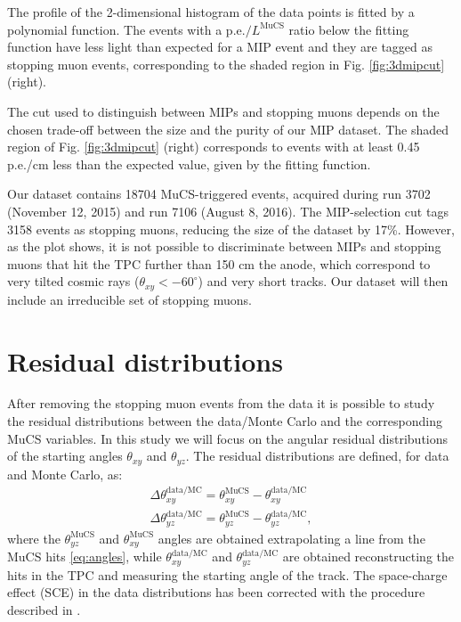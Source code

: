 \documentclass[a4paper]{scrartcl}
\begin{document}
The profile of the 2-dimensional histogram of the data points is fitted by a polynomial function.
The events with a p.e.$/L^{\mathrm{MuCS}}$ ratio below the fitting function have less light than expected for a MIP event and they are tagged as stopping muon events, corresponding to the shaded region in Fig. \ref{fig:3dmipcut} (right). %

The cut used to distinguish between MIPs and stopping muons depends on the chosen trade-off between the size and the purity of our MIP dataset. The shaded region of Fig. \ref{fig:3dmipcut} (right) corresponds to events with at least 0.45 p.e./cm less than the expected value, given by the fitting function.



Our dataset contains 18704 MuCS-triggered events, acquired during run 3702 (November 12, 2015) and run 7106 (August 8, 2016). The MIP-selection cut tags 3158 events as stopping muons, reducing the size of the dataset by 17\%.
However, as the plot shows, it is not possible to discriminate between MIPs and stopping muons that hit the TPC further than 150 cm the anode, which correspond to very tilted cosmic rays ($\theta_{xy}<-60^{\circ}$) and very short tracks. Our dataset will then include an irreducible set of stopping muons.

\section{Residual distributions}
After removing the stopping muon events from the data it is possible to study the residual distributions between the data/Monte Carlo and the corresponding MuCS variables. In this study we will focus on the angular residual distributions of the starting angles $\theta_{xy}$ and $\theta_{yz}$. The residual distributions are defined, for data and Monte Carlo, as:
\begin{align*}
\Delta \theta_{xy}^{\mathrm{data/MC}} = \theta_{xy}^{\mathrm{MuCS}} - \theta_{xy}^{\mathrm{data/MC}}\\
\Delta \theta_{yz}^{\mathrm{data/MC}} = \theta_{yz}^{\mathrm{MuCS}} -  \theta_{yz}^{\mathrm{data/MC}},
\end{align*}
where the $\theta_{yz}^{\mathrm{MuCS}}$ and $\theta_{xy}^{\mathrm{MuCS}}$ angles are obtained extrapolating a line from the MuCS hits \eqref{eq:angles}, while $\theta_{xy}^{\mathrm{data/MC}}$ and $\theta_{yz}^{\mathrm{data/MC}}$ are obtained reconstructing the hits in the TPC and measuring the starting angle of the track.
The space-charge effect (SCE) in the data distributions has been corrected with the procedure described in \cite{sce}.
\end{document}

